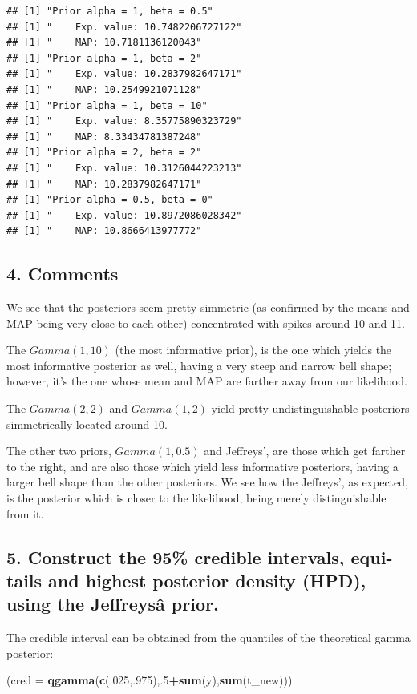 \documentclass[]{article}
\newenvironment{Shaded}{\begin{snugshade}}{\end{snugshade}}
\newcommand{\KeywordTok}[1]{\textcolor[rgb]{0.13,0.29,0.53}{\textbf{#1}}}
\newcommand{\DataTypeTok}[1]{\textcolor[rgb]{0.13,0.29,0.53}{#1}}
\newcommand{\DecValTok}[1]{\textcolor[rgb]{0.00,0.00,0.81}{#1}}
\newcommand{\OperatorTok}[1]{\textcolor[rgb]{0.81,0.36,0.00}{\textbf{#1}}}
\newcommand{\NormalTok}[1]{#1}
\begin{document}
\begin{verbatim}
## [1] "Prior alpha = 1, beta = 0.5"
## [1] "    Exp. value: 10.7482206727122"
## [1] "    MAP: 10.7181136120043"
## [1] "Prior alpha = 1, beta = 2"
## [1] "    Exp. value: 10.2837982647171"
## [1] "    MAP: 10.2549921071128"
## [1] "Prior alpha = 1, beta = 10"
## [1] "    Exp. value: 8.35775890323729"
## [1] "    MAP: 8.33434781387248"
## [1] "Prior alpha = 2, beta = 2"
## [1] "    Exp. value: 10.3126044223213"
## [1] "    MAP: 10.2837982647171"
## [1] "Prior alpha = 0.5, beta = 0"
## [1] "    Exp. value: 10.8972086028342"
## [1] "    MAP: 10.8666413977772"
\end{verbatim}

\subsection{4. Comments}\label{comments}

We see that the posteriors seem pretty simmetric (as confirmed by the
means and MAP being very close to each other) concentrated with spikes
around 10 and 11.

The \(Gamma(1,10)\) (the most informative prior), is the one which
yields the most informative posterior as well, having a very steep and
narrow bell shape; however, it's the one whose mean and MAP are farther
away from our likelihood.

The \(Gamma(2,2)\) and \(Gamma(1,2)\) yield pretty undistinguishable
posteriors simmetrically located around 10.

The other two priors, \(Gamma(1, 0.5)\) and Jeffreys', are those which
get farther to the right, and are also those which yield less
informative posteriors, having a larger bell shape than the other
posteriors. We see how the Jeffreys', as expected, is the posterior
which is closer to the likelihood, being merely distinguishable from it.

\subsection{5. Construct the 95\% credible intervals, equi-tails and
highest posterior density (HPD), using the Jeffreysâ
prior.}\label{construct-the-95-credible-intervals-equi-tails-and-highest-posterior-density-hpd-using-the-jeffreysa-prior.}

The credible interval can be obtained from the quantiles of the
theoretical gamma posterior:

\begin{Shaded}
\begin{Highlighting}[]
\NormalTok{(}\DataTypeTok{cred =} \KeywordTok{qgamma}\NormalTok{(}\KeywordTok{c}\NormalTok{(.}\DecValTok{025}\NormalTok{,.}\DecValTok{975}\NormalTok{),.}\DecValTok{5}\OperatorTok{+}\KeywordTok{sum}\NormalTok{(y),}\KeywordTok{sum}\NormalTok{(t_new)))}
\end{Highlighting}
\end{Shaded}
\end{document}
